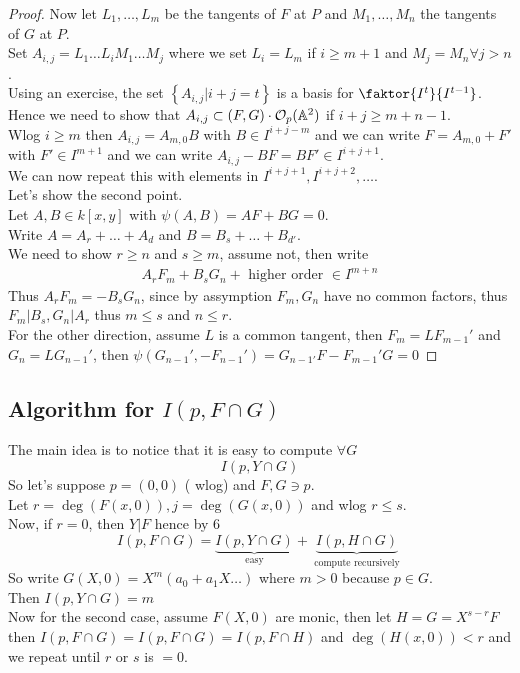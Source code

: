 \documentclass[../main.tex]{subfiles}
\begin{document}
\begin{proof}
Now let $L_1,\ldots,L_m$ be the tangents of $F$ at $P$ and $M_1,\ldots,M_n$ the tangents of $G$ at $P$.\\
Set $A_{i,j} = L_1\ldots L_iM_1\ldots M_j$ where we set $L_i=L_m$ if $i \geq m+1$ and $M_j=M_n\forall j>n$.\\
Using an exercise, the set $ \left\{ A_{i,j} | i+j=t \right\} $ is a basis for $ \faktor{I^{t}}{I^{t-1}}$.\\
Hence we need to show that $A_{i,j} \subset ( F,G) \cdot \mathcal{O}_p( \mathbb{A}^{2}) $ if $i+j \geq m+n-1$.\\
Wlog $i \geq m$ then $A_{i,j} =  A_{m,0} B$ with $B\in I^{i+j-m}$ and we can write $F= A_{m,0} + F'$ with $F'\in I^{m+1}$ and we can write $A_{i,j} -BF = BF' \in I^{i+j+1}$.\\
We can now repeat this with elements in $I^{i+j+1}, I^{i+j+2},\ldots$.\\

Let's show the second point.\\
Let $A,B\in k[x,y]$ with $ \psi( A,B) = AF+BG=0$.\\
Write $A= A_r+\ldots+A_d$ and $B=B_s+ \ldots +B_{d'} $.\\
We need to show $ r \geq n$ and $s \geq m$, assume not, then write 
\begin{align*}
	A_r F_m +B_s G_n + \text{ higher order } \in I^{m+n}
\end{align*}
Thus $A_r F_m = -B_s G_n$, since by assymption $F_m, G_n$ have no common factors, thus $F_m |B_s, G_n|A_r$ thus $m \leq s$ and $n \leq r$.\\
For the other direction, assume $L$ is a common tangent, then $F_m= L F_{m-1} '$ and $G_n = L G_{n-1}'$, then $\psi( G_{n-1}', -F_{n-1}') = G_{n-1'} F- F_{m-1}' G= 0$ 

		

\end{proof}
\subsection{Algorithm for $I( p,F\cap G) $ }
The main idea is to notice that it is easy to compute $\forall G$ 
\[ 
I( p,Y\cap G) 
\]
So let's suppose $p=( 0,0) $ ( wlog) and $F,G\ni p$.\\
Let $r= \deg ( F( x,0) ) , j = \deg ( G( x,0) ) $ and wlog $r \leq s$.\\
Now, if $r=0$, then $Y|F$ hence by $6$ 
\[ 
I( p,F\cap G) = \underbrace{I( p,Y\cap G)}_{ \text{ easy } }  + \underbrace{I( p,H\cap G)}_{ \text{ compute recursively } } 
\]
So write $G( X,0) = X^{m}( a_0 + a_1 X \ldots ) $ where $m>0$ because $p\in G$.\\
Then $I( p, Y\cap G) =m$\\
Now for the second case, assume $F( X,0) $ are monic, then let $H= G= X^{s-r}F$ then $I( p,F\cap G) = I( p, F\cap G) = I( p,F\cap H) $ and $\deg ( H( x,0) ) <r$ and we repeat until $r$ or $s$ is $=0$.\\
\end{document}
